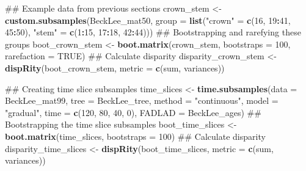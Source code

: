 \documentclass[]{book}
\newenvironment{Shaded}{\begin{snugshade}}{\end{snugshade}}
\newcommand{\KeywordTok}[1]{\textcolor[rgb]{0.13,0.29,0.53}{\textbf{#1}}}
\newcommand{\DataTypeTok}[1]{\textcolor[rgb]{0.13,0.29,0.53}{#1}}
\newcommand{\DecValTok}[1]{\textcolor[rgb]{0.00,0.00,0.81}{#1}}
\newcommand{\StringTok}[1]{\textcolor[rgb]{0.31,0.60,0.02}{#1}}
\newcommand{\OtherTok}[1]{\textcolor[rgb]{0.56,0.35,0.01}{#1}}
\newcommand{\OperatorTok}[1]{\textcolor[rgb]{0.81,0.36,0.00}{\textbf{#1}}}
\newcommand{\NormalTok}[1]{#1}
\theoremstyle{definition}
\theoremstyle{definition}
\theoremstyle{remark}
\begin{document}
\begin{Shaded}
\begin{Highlighting}[]
\NormalTok{## Example data from previous sections}
\NormalTok{crown_stem <-}\StringTok{ }\KeywordTok{custom.subsamples}\NormalTok{(BeckLee_mat50,}
                                \DataTypeTok{group =} \KeywordTok{list}\NormalTok{(}\StringTok{"crown"}\NormalTok{ =}\StringTok{ }\KeywordTok{c}\NormalTok{(}\DecValTok{16}\NormalTok{, }\DecValTok{19}\OperatorTok{:}\DecValTok{41}\NormalTok{, }\DecValTok{45}\OperatorTok{:}\DecValTok{50}\NormalTok{), }
                                             \StringTok{"stem"}\NormalTok{ =}\StringTok{ }\KeywordTok{c}\NormalTok{(}\DecValTok{1}\OperatorTok{:}\DecValTok{15}\NormalTok{, }\DecValTok{17}\OperatorTok{:}\DecValTok{18}\NormalTok{, }\DecValTok{42}\OperatorTok{:}\DecValTok{44}\NormalTok{)))}
\NormalTok{## Bootstrapping and rarefying these groups}
\NormalTok{boot_crown_stem <-}\StringTok{ }\KeywordTok{boot.matrix}\NormalTok{(crown_stem, }\DataTypeTok{bootstraps =} \DecValTok{100}\NormalTok{, }\DataTypeTok{rarefaction =} \OtherTok{TRUE}\NormalTok{)}
\NormalTok{## Calculate disparity}
\NormalTok{disparity_crown_stem <-}\StringTok{ }\KeywordTok{dispRity}\NormalTok{(boot_crown_stem, }\DataTypeTok{metric =} \KeywordTok{c}\NormalTok{(sum, variances))}

\NormalTok{## Creating time slice subsamples}
\NormalTok{time_slices <-}\StringTok{ }\KeywordTok{time.subsamples}\NormalTok{(}\DataTypeTok{data =}\NormalTok{ BeckLee_mat99, }\DataTypeTok{tree =}\NormalTok{ BeckLee_tree, }
    \DataTypeTok{method =} \StringTok{"continuous"}\NormalTok{, }\DataTypeTok{model =} \StringTok{"gradual"}\NormalTok{, }\DataTypeTok{time =} \KeywordTok{c}\NormalTok{(}\DecValTok{120}\NormalTok{, }\DecValTok{80}\NormalTok{, }\DecValTok{40}\NormalTok{, }\DecValTok{0}\NormalTok{),}
    \DataTypeTok{FADLAD =}\NormalTok{ BeckLee_ages)}
\NormalTok{## Bootstrapping the time slice subsamples}
\NormalTok{boot_time_slices <-}\StringTok{ }\KeywordTok{boot.matrix}\NormalTok{(time_slices, }\DataTypeTok{bootstraps =} \DecValTok{100}\NormalTok{)}
\NormalTok{## Calculate disparity}
\NormalTok{disparity_time_slices <-}\StringTok{ }\KeywordTok{dispRity}\NormalTok{(boot_time_slices, }\DataTypeTok{metric =} \KeywordTok{c}\NormalTok{(sum, variances))}


\end{Highlighting}
\end{Shaded}
\end{document}
